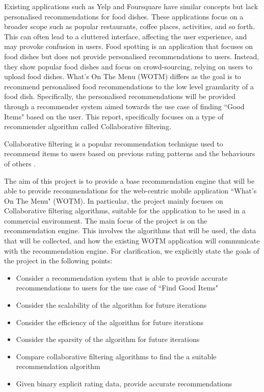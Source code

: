 Existing applications such as Yelp and Foursquare have similar concepts but lack personalised recommendations for food dishes. These applications focus on a broader scope such as popular restaurants, coffee places, activities, and so forth. This can often lead to a cluttered interface, affecting the user experience, and may provoke confusion in users. Food spotting is an application that focuses on food dishes but does not provide personalised recommendations to users. Instead, they show popular food dishes and focus on crowd-sourcing, relying on users to upload food dishes. What's On The Menu (WOTM) differs as the goal is to recommend personalised food recommendations to the low level granularity of a food dish. Specifically, the personalised recommendations will be provided through a recommender system aimed towards the use case of finding ``Good Items" based on the user. This report, specifically focuses on a type of recommender algorithm called Collaborative filtering. 

Collaborative filtering is a popular recommendation technique used to recommend items to users based on previous rating patterns and the behaviours of others \cite{itembased, schafer2007collaborative, survey}. 

The aim of this project is to provide a base recommendation engine that will be able to provide recommendations for the web-centric mobile application ``What's On The Menu" (WOTM). In particular, the project mainly focuses on Collaborative filtering algorithms, suitable for the application to be used in a commercial environment. The main focus of the project is on the recommendation engine. This involves the algorithms that will be used, the data that will be collected, and how the existing WOTM application will communicate with the recommendation engine. 
For clarification, we explicitly state the goals of the project in the following points:
\begin{itemize}
	\item{Consider a recommendation system that is able to provide accurate recommendations to users for the use case of ``Find Good Items"}
	\item{Consider the scalability of the algorithm for future iterations}
	\item{Consider the efficiency of the algorithm for future iterations}
	\item{Consider the sparsity of the algorithm for future iterations}
    \item{Compare collaborative filtering algorithms to find the a suitable recommendation algorithm}
	\item{Given binary explicit rating data, provide accurate recommendations}
\end{itemize}

